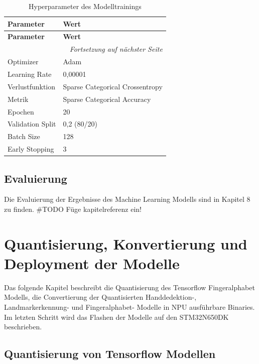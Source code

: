 \begin{longtable}{|p{}|p{}|}
    \caption{Hyperparameter des Modelltrainings}
    \label{tab:hyperparameter} \\
    \hline
    \textbf{Parameter} & \textbf{Wert} \\
    \hline
    \endfirsthead
    \hline
    \textbf{Parameter} & \textbf{Wert} \\
    \hline
    \endhead
    \hline
    \multicolumn{2}{r}{\textit{Fortsetzung auf nächster Seite}} \\
    \endfoot
    \hline
    \endlastfoot
    Optimizer & Adam \\
    \hline
    Learning Rate & 0,00001 \\
    \hline
    Verlustfunktion & Sparse Categorical Crossentropy \\
    \hline
    Metrik & Sparse Categorical Accuracy \\
    \hline
    Epochen & 20 \\
    \hline
    Validation Split & 0,2 (80/20) \\
    \hline
    Batch Size & 128 \\
    \hline
    Early Stopping & 3 \\
    \hline
\end{longtable}

\subsection{Evaluierung}

Die Evaluierung der Ergebnisse des Machine Learning Modells sind in Kapitel 8 zu finden.
\#TODO Füge kapitelreferenz ein!

\section{Quantisierung, Konvertierung und Deployment der Modelle}

Das folgende Kapitel beschreibt die Quantisierung des Tensorflow Fingeralphabet Modells, die Convertierung der Quantisierten Handdedektion-, Landmarkerkennung- und Fingeralphabet- Modelle in NPU ausführbare Binaries. Im letzten Schritt wird das Flashen der Modelle auf den STM32N650DK beschrieben.

\subsection{Quantisierung von Tensorflow Modellen}

